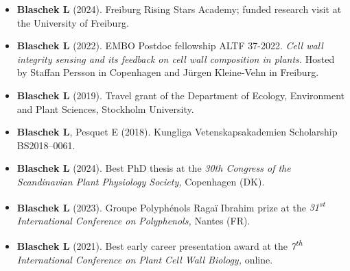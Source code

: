 \documentclass[11pt]{article}
\begin{document}
\vspace{-0.175cm}
\begin{itemize}[label={},itemindent=-9pt,leftmargin=24pt]
	\itemsep-0.1cm
	\item \textbf{Blaschek L} (2024).  Freiburg Rising Stars Academy; funded research visit at the University of Freiburg. 
	\item \textbf{Blaschek L} (2022). EMBO Postdoc fellowship ALTF 37-2022. \textit{Cell wall integrity sensing and its feedback on cell wall composition in plants.} Hosted by Staffan Persson in Copenhagen and Jürgen Kleine-Vehn in Freiburg.
	\item \textbf{Blaschek L} (2019). Travel grant of the Department of Ecology, Environment and Plant Sciences, Stockholm University.
	\item \textbf{Blaschek L}, Pesquet E (2018). Kungliga Vetenskapsakademien Scholarship BS2018--0061.
\end{itemize}
\vspace{0.3cm}

\vspace{-0.175cm}
\begin{itemize}[label={},itemindent=-9pt,leftmargin=24pt]
	\itemsep-0.1cm
	\item \textbf{Blaschek L} (2024). Best PhD thesis at the \textit{30th Congress of the Scandinavian Plant Physiology Society,} Copenhagen (DK). 
	\item \textbf{Blaschek L} (2023). Groupe Polyphénols Ragaï Ibrahim prize at the \textit{31\textsuperscript{st} International Conference on Polyphenols,} Nantes (FR).
	\item \textbf{Blaschek L} (2021). Best early career presentation award at the \textit{7\textsuperscript{th} International Conference on Plant Cell Wall Biology,} online.
\end{itemize}
\vspace{0.3cm}

\newpage


\vspace{0.3cm}
\end{document}
